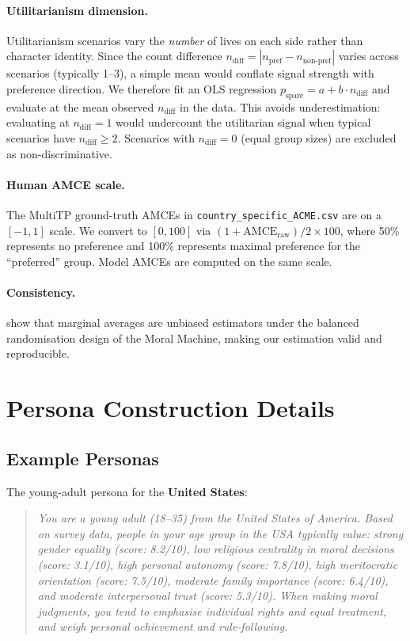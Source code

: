 \documentclass{article}
\begin{document}
\paragraph{Utilitarianism dimension.} Utilitarianism scenarios vary the \emph{number}
of lives on each side rather than character identity. Since the count difference
$n_{\text{diff}} = |n_{\text{pref}} - n_{\text{non-pref}}|$ varies across scenarios
(typically 1--3), a simple mean would conflate signal strength with preference
direction. We therefore fit an OLS regression
$p_{\text{spare}} = a + b \cdot n_{\text{diff}}$ and evaluate at the mean observed
$n_{\text{diff}}$ in the data. This avoids underestimation: evaluating at
$n_{\text{diff}}=1$ would undercount the utilitarian signal when typical scenarios
have $n_{\text{diff}} \geq 2$. Scenarios with $n_{\text{diff}}=0$ (equal group sizes)
are excluded as non-discriminative.

\paragraph{Human AMCE scale.} The MultiTP ground-truth AMCEs in
\texttt{country\_specific\_ACME.csv} are on a $[-1, 1]$ scale. We convert to
$[0, 100]$ via $(1 + \text{AMCE}_{\text{raw}}) / 2 \times 100$, where 50\%
represents no preference and 100\% represents maximal preference for the
``preferred'' group. Model AMCEs are computed on the same scale.

\paragraph{Consistency.} \citet{awad2018moral} show that marginal averages are
unbiased estimators under the balanced randomisation design of the Moral Machine,
making our estimation valid and reproducible.

\section{Persona Construction Details}
\label{app:personas}

\subsection{Example Personas}

The young-adult persona for the \textbf{United States}:
\begin{quote}
\small\itshape
You are a young adult (18--35) from the United States of America. Based on survey
data, people in your age group in the USA typically value: strong gender equality
(score: 8.2/10), low religious centrality in moral decisions (score: 3.1/10), high
personal autonomy (score: 7.8/10), high meritocratic orientation (score: 7.5/10),
moderate family importance (score: 6.4/10), and moderate interpersonal trust
(score: 5.3/10). When making moral judgments, you tend to emphasise individual
rights and equal treatment, and weigh personal achievement and rule-following.
\end{quote}
\end{document}
